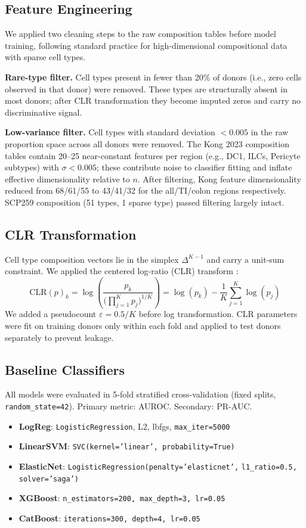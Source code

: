 \documentclass[11pt,letterpaper]{article}
\begin{document}
\subsection{Feature Engineering}

We applied two cleaning steps to the raw composition tables before model training,
following standard practice for high-dimensional compositional data with sparse
cell types.

\textbf{Rare-type filter.} Cell types present in fewer than 20\% of donors
(i.e., zero cells observed in that donor) were removed. These types are
structurally absent in most donors; after CLR transformation they become
imputed zeros and carry no discriminative signal.

\textbf{Low-variance filter.} Cell types with standard deviation $< 0.005$
in the raw proportion space across all donors were removed. The Kong 2023
composition tables contain 20--25 near-constant features per region (e.g.,
DC1, ILCs, Pericyte subtypes) with $\sigma < 0.005$; these contribute noise to
classifier fitting and inflate effective dimensionality relative to $n$.
After filtering, Kong feature dimensionality reduced from 68/61/55 to
43/41/32 for the all/TI/colon regions respectively. SCP259 composition (51
types, 1 sparse type) passed filtering largely intact.

\subsection{CLR Transformation}

Cell type composition vectors lie in the simplex $\Delta^{K-1}$ and carry a
unit-sum constraint. We applied the centered log-ratio (CLR)
transform \citep{aitchison1982statistical}:
\[
\text{CLR}(p)_k = \log\!\left(\frac{p_k}{\bigl(\prod_{j=1}^{K} p_j\bigr)^{1/K}}\right)
= \log(p_k) - \frac{1}{K}\sum_{j=1}^{K}\log(p_j)
\]
We added a pseudocount $\varepsilon = 0.5/K$ before log transformation. CLR
parameters were fit on training donors only within each fold and applied to test
donors separately to prevent leakage.

\subsection{Baseline Classifiers}

All models were evaluated in 5-fold stratified cross-validation (fixed splits,
\texttt{random\_state=42}). Primary metric: AUROC. Secondary: PR-AUC.

{\small
\begin{itemize}[noitemsep]
  \item \textbf{LogReg}: \texttt{LogisticRegression}, L2, lbfgs, \texttt{max\_iter=5000}
  \item \textbf{LinearSVM}: \texttt{SVC(kernel='linear', probability=True)}
  \item \textbf{ElasticNet}: \texttt{LogisticRegression(penalty='elasticnet',} \texttt{l1\_ratio=0.5, solver='saga')}
  \item \textbf{XGBoost}: \texttt{n\_estimators=200, max\_depth=3, lr=0.05}
  \item \textbf{CatBoost}: \texttt{iterations=300, depth=4, lr=0.05}
\end{itemize}
}
\end{document}
